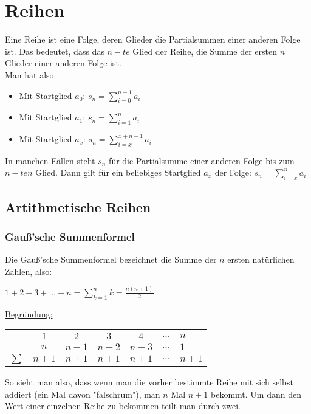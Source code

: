 \documentclass[main.tex]{subfiles}
\begin{document}
\chapter{Reihen}

\begin{Definition}
	Eine Reihe ist eine Folge, deren Glieder die Partialsummen einer anderen Folge ist. Das bedeutet, dass das $n-te$ Glied der Reihe, die Summe der ersten $n$ Glieder einer anderen Folge ist. \\
	Man hat also:

	\begin{itemize}
		\item Mit Startglied $a_{0}$: $s_{n}=\sum\limits_{i=0}^{n-1}a_{i}$
		\item Mit Startglied $a_{1}$: $s_{n}=\sum\limits_{i=1}^{n}a_{i}$
		\item Mit Startglied $a_{x}$: $s_{n}=\sum\limits_{i=x}^{x+n-1}a_{i}$
	\end{itemize}
\end{Definition}

\begin{Bemerkung}
	In manchen Fällen steht $s_{n}$ für die Partialsumme einer anderen Folge bis zum $n-ten$ Glied.
	Dann gilt für ein beliebiges Startglied $a_{x}$ der Folge: $s_{n}=\sum\limits_{i=x}^{n}a_{i}$
\end{Bemerkung}

\section{Artithmetische Reihen}
\subsection{Gauß'sche Summenformel}

Die Gauß'sche Summenformel bezeichnet die Summe der $n$ ersten natürlichen Zahlen, also:

$1+2+3+...+n=\sum\limits_{k=1}^{n}k=\frac{n(n+1)}{2}$


\begin{minipage}[c]{0.5\textwidth}
	\underline{Begründung:}

	\begin{tabular}{c | c | c | c | c | c}
		&$1$&$2$&$3$&$4$&$...$&$n$\\\hline
		&$n$&$n-1$&$n-2$&$n-3$&$...$&$1$\\\hline
		$\sum$&$n+1$&$n+1$&$n+1$&$n+1$&$...$&$n+1$\\
	\end{tabular}
\end{minipage}
\begin{minipage}{0.5\textwidth}
	So sieht man also, dass wenn man die vorher bestimmte Reihe mit sich selbst addiert (ein Mal davon "falschrum"), man $n$ Mal $n+1$ bekommt. Um dann den Wert einer einzelnen Reihe zu bekommen teilt man durch zwei.
\end{minipage}
\end{document}
